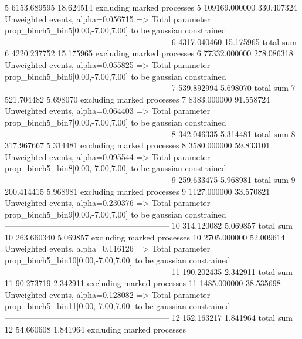 5          6153.689595     18.624514       excluding marked processes    
5          109169.000000   330.407324      Unweighted events, alpha=0.056715
  => Total parameter prop_binch5_bin5[0.00,-7.00,7.00] to be gaussian constrained
------------------------------------------------------------
6          4317.040460     15.175965       total sum                     
6          4220.237752     15.175965       excluding marked processes    
6          77332.000000    278.086318      Unweighted events, alpha=0.055825
  => Total parameter prop_binch5_bin6[0.00,-7.00,7.00] to be gaussian constrained
------------------------------------------------------------
7          539.892994      5.698070        total sum                     
7          521.704482      5.698070        excluding marked processes    
7          8383.000000     91.558724       Unweighted events, alpha=0.064403
  => Total parameter prop_binch5_bin7[0.00,-7.00,7.00] to be gaussian constrained
------------------------------------------------------------
8          342.046335      5.314481        total sum                     
8          317.967667      5.314481        excluding marked processes    
8          3580.000000     59.833101       Unweighted events, alpha=0.095544
  => Total parameter prop_binch5_bin8[0.00,-7.00,7.00] to be gaussian constrained
------------------------------------------------------------
9          259.633475      5.968981        total sum                     
9          200.414415      5.968981        excluding marked processes    
9          1127.000000     33.570821       Unweighted events, alpha=0.230376
  => Total parameter prop_binch5_bin9[0.00,-7.00,7.00] to be gaussian constrained
------------------------------------------------------------
10         314.120082      5.069857        total sum                     
10         263.660340      5.069857        excluding marked processes    
10         2705.000000     52.009614       Unweighted events, alpha=0.116126
  => Total parameter prop_binch5_bin10[0.00,-7.00,7.00] to be gaussian constrained
------------------------------------------------------------
11         190.202435      2.342911        total sum                     
11         90.273719       2.342911        excluding marked processes    
11         1485.000000     38.535698       Unweighted events, alpha=0.128082
  => Total parameter prop_binch5_bin11[0.00,-7.00,7.00] to be gaussian constrained
------------------------------------------------------------
12         152.163217      1.841964        total sum                     
12         54.660608       1.841964        excluding marked processes    
